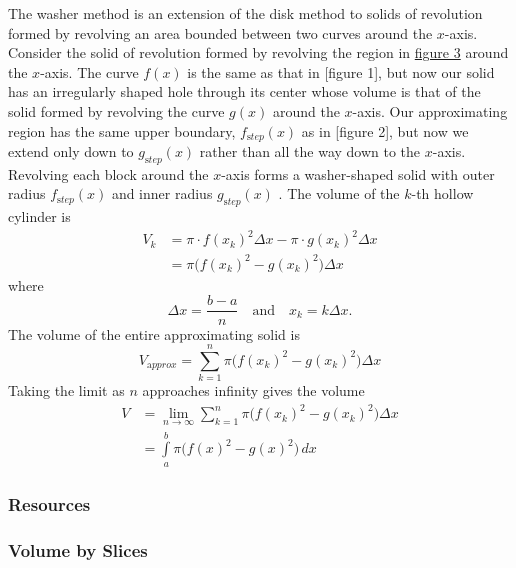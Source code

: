 The washer method is an extension of the disk method to solids of
revolution formed by revolving an area bounded between two curves around
the $x$-axis. Consider the solid of revolution formed by revolving the
region in \href{:File:Generating_fxs_washer_method.svg "wikilink"}{figure 3}
around the $x$-axis. The curve $f(x)$ is the same as that in [figure
1], but now our solid
has an irregularly shaped hole through its center whose volume is that
of the solid formed by revolving the curve $g(x)$ around the $x$-axis.
Our approximating region has the same upper boundary, $f _{\mathrm step}(x)$
as in [figure 2],
but now we extend only down to $g _{\mathrm step}(x)$ rather than all the way
down to the $x$-axis. Revolving each block around the $x$-axis forms a
washer-shaped solid with outer radius $f_ {\mathrm step}(x)$ and inner radius
$g_ {\mathrm step}(x)$ . The volume of the $k$-th hollow cylinder is
\begin{align}
V_k &= \pi\cdot f(x_k)^2 \Delta x - \pi\cdot g(x_k)^2 \Delta x \\&= \pi\bigl(f(x_k)^2 - g(x_k)^2\bigr)\Delta x
\end{align}
where 
\[
\Delta x = \frac{b-a}{n} \quad \text{and} \quad x_k = k\Delta x.
\]
The volume of the entire approximating solid is
\[
V _{\mathrm approx}=\sum _{k=1}^n \pi\bigl(f(x_k)^2-g(x_k)^2\bigr)\Delta x
\]
Taking the limit as $n$ approaches infinity gives the volume
\begin{align} V &= \lim_{n\to\infty}\sum _{k=1}^n \pi\bigl(f(x_k)^2 - g(x_k)^2\bigr)\Delta x \\ &= \int\limits_a^b \pi\bigl(f(x)^2 - g(x)^2\bigr)\,dx \end{align} 

\subsubsection{Resources}
\label{sss:reso-55b5}

\subsubsection{Volume by Slices}
\label{sss:volu-9ae4}

